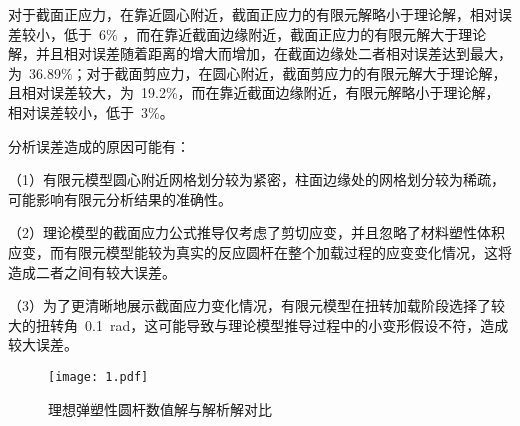对于截面正应力，在靠近圆心附近，截面正应力的有限元解略小于理论解，相对误差较小，低于~6\% ，而在靠近截面边缘附近，截面正应力的有限元解大于理论解，并且相对误差随着距离的增大而增加，在截面边缘处二者相对误差达到最大，为~36.89\%；对于截面剪应力，在圆心附近，截面剪应力的有限元解大于理论解，且相对误差较大，为~19.2\%，而在靠近截面边缘附近，有限元解略小于理论解，相对误差较小，低于~3\%。

分析误差造成的原因可能有：

（1）有限元模型圆心附近网格划分较为紧密，柱面边缘处的网格划分较为稀疏，可能影响有限元分析结果的准确性。

（2）理论模型的截面应力公式推导仅考虑了剪切应变，并且忽略了材料塑性体积应变，而有限元模型能较为真实的反应圆杆在整个加载过程的应变变化情况，这将造成二者之间有较大误差。

（3）为了更清晰地展示截面应力变化情况，有限元模型在扭转加载阶段选择了较大的扭转角~0.1~rad，这可能导致与理论模型推导过程中的小变形假设不符，造成较大误差。
\begin{figure}[htbp]
    \centering
	\texttt{[image: 1.pdf]}
    \caption{理想弹塑性圆杆数值解与解析解对比}
    \label{fig:ideals3323}
\end{figure}







